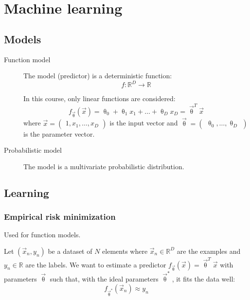 \chapter{Machine learning}


\section{Models}

\begin{description}
    \item[Function model] 
        The model (predictor) is a deterministic function:
        \[ f: \mathbb{R}^D \rightarrow \mathbb{R} \]

        In this course, only linear functions are considered:
        \[ f_\vec{\uptheta}(\vec{x}) = \uptheta_0 + \uptheta_1 x_1 + \dots + \uptheta_D x_D = \vec{\uptheta}^T \vec{x} \]
        where $\vec{x} = \begin{pmatrix} 1, x_1, \dots, x_D \end{pmatrix}$ is the input vector and
        $\vec{\uptheta} = \begin{pmatrix} \uptheta_0, \dots, \uptheta_D \end{pmatrix}$ is the parameter vector.

    \item[Probabilistic model] 
        The model is a multivariate probabilistic distribution.
\end{description}



\section{Learning}

\subsection{Empirical risk minimization}
Used for function models.

Let $(\vec{x}_n, y_n)$ be a dataset of $N$ elements
where $\vec{x}_n \in \mathbb{R}^D$ are the examples and $y_n \in \mathbb{R}$ are the labels.
We want to estimate a predictor $f_\vec{\uptheta}(\vec{x}) = \vec{\uptheta}^T \vec{x}$ with parameters $\vec{\uptheta}$
such that, with the ideal parameters $\vec{\uptheta}^*$, it fits the data well:
\[ f_{\vec{\uptheta}^*}(\vec{x}_n) \approx y_n \]

